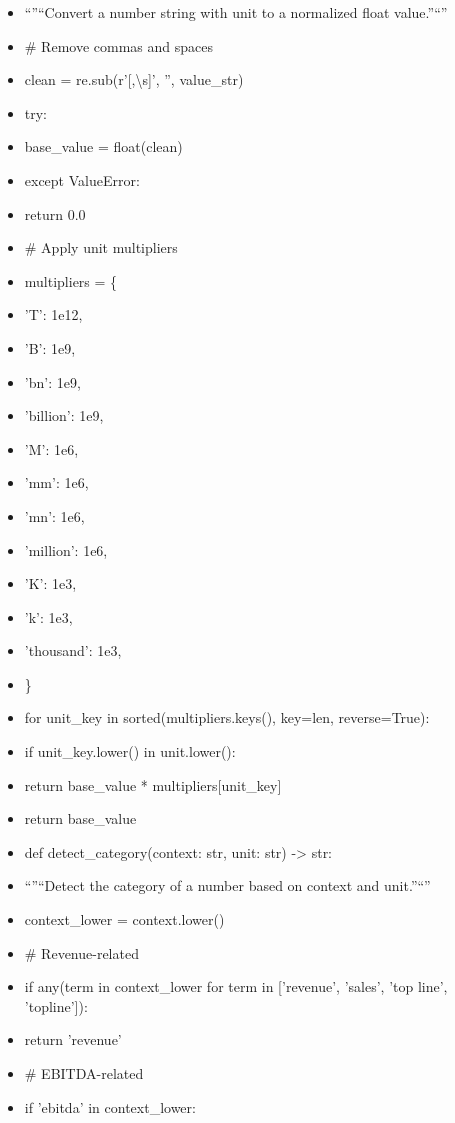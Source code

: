 \documentclass[11pt]{article}
\begin{document}
\begin{itemize}[leftmargin=*,itemsep=2pt,topsep=2pt]
\item {} ``''``Convert a number string with unit to a normalized float value.''``''
\item {} \# Remove commas and spaces
\item {} clean = re.sub(r'[,\textbackslash{}s]', '', value\_\allowbreak{}str)
\item {} try:
\item {} base\_\allowbreak{}value = float(clean)
\item {} except ValueError:
\item {} return 0.0
\item {} \# Apply unit multipliers
\item {} multipliers = \{
\item {} 'T': 1e12,
\item {} 'B': 1e9,
\item {} 'bn': 1e9,
\item {} 'billion': 1e9,
\item {} 'M': 1e6,
\item {} 'mm': 1e6,
\item {} 'mn': 1e6,
\item {} 'million': 1e6,
\item {} 'K': 1e3,
\item {} 'k': 1e3,
\item {} 'thousand': 1e3,
\item {} \}
\item {} for unit\_\allowbreak{}key in sorted(multipliers.keys(), key=len, reverse=True):
\item {} if unit\_\allowbreak{}key.lower() in unit.lower():
\item {} return base\_\allowbreak{}value * multipliers[unit\_\allowbreak{}key]
\item {} return base\_\allowbreak{}value
\item {} def detect\_\allowbreak{}category(context: str, unit: str) -> str:
\item {} ``''``Detect the category of a number based on context and unit.''``''
\item {} context\_\allowbreak{}lower = context.lower()
\item {} \# Revenue-related
\item {} if any(term in context\_\allowbreak{}lower for term in ['revenue', 'sales', 'top line', 'topline']):
\item {} return 'revenue'
\item {} \# EBITDA-related
\item {} if 'ebitda' in context\_\allowbreak{}lower:

\end{itemize}
\end{document}

